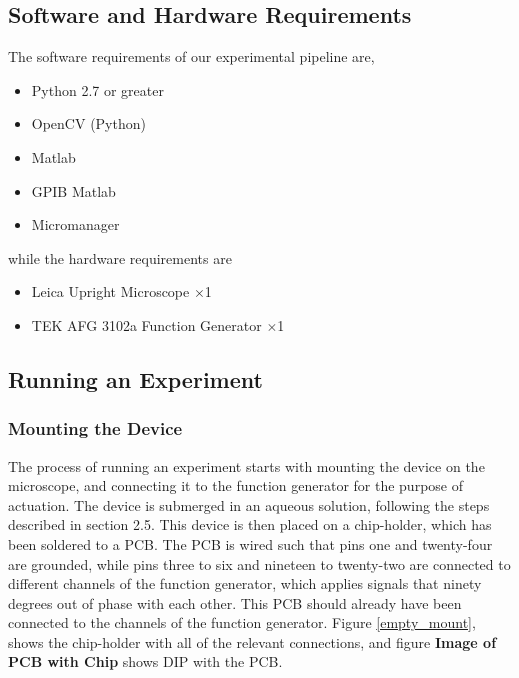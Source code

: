 \subsection{Software and Hardware Requirements}
The software requirements of our experimental pipeline are,

\begin{itemize}
    \item Python 2.7 or greater
    \item OpenCV (Python)
    \item Matlab
    \item GPIB Matlab
    \item Micromanager 
\end{itemize}

while the hardware requirements are

\begin{itemize}
    \item Leica Upright Microscope $\times$1
    \item TEK AFG 3102a Function Generator $\times$1
\end{itemize}

\subsection{Running an Experiment}
\subsubsection{Mounting the Device}
The process of running an experiment starts with mounting the device on the microscope, and connecting it to the function generator for the purpose of actuation. The device is submerged in an aqueous solution, following the steps described in section 2.5. This device is then placed on a chip-holder, which has been soldered to a PCB. The PCB is wired such that pins one and twenty-four are grounded, while pins three to six and nineteen to twenty-two are connected to different channels of the function generator, which applies signals that ninety degrees out of phase with each other. This PCB should already have been connected to the channels of the function generator. Figure \ref{empty_mount}, shows the chip-holder with all of the relevant connections, and figure \textbf{Image of PCB with Chip} shows DIP with the PCB.

